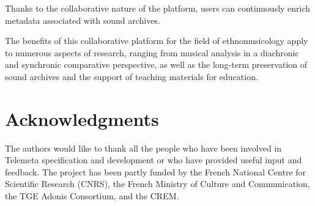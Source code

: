 \documentclass{sig-alternate}
\begin{document}
Thanks to the collaborative nature of the platform, users can continuously enrich metadata associated with sound archives. 

The benefits of this collaborative platform for the field of ethnomusicology apply to numerous aspects of research, ranging from musical analysis in a diachronic and synchronic comparative perspective, as well as the long-term preservation of sound archives and the support of teaching materials for education. 


\section{Acknowledgments}
The authors would like to thank all the people who have been involved in Telemeta specification and development or who have provided useful input and feedback. 
The project has been partly funded by the French National Centre for Scientific Research (CNRS), the French Ministry of Culture and Communication, the TGE Adonis Consortium, and the CREM.





\end{document}
